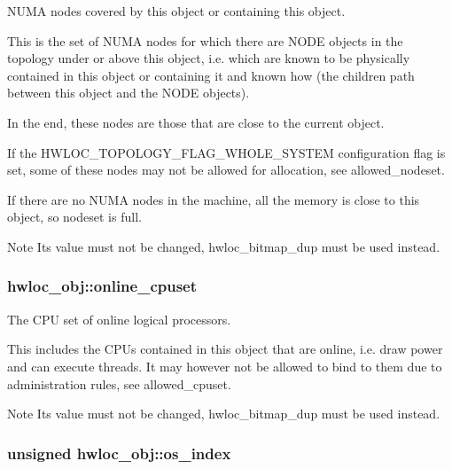 NUMA nodes covered by this object or containing this object. 

This is the set of NUMA nodes for which there are NODE objects in the topology under or above this object, i.e. which are known to be physically contained in this object or containing it and known how (the children path between this object and the NODE objects).

In the end, these nodes are those that are close to the current object.

If the HWLOC\_\-TOPOLOGY\_\-FLAG\_\-WHOLE\_\-SYSTEM configuration flag is set, some of these nodes may not be allowed for allocation, see allowed\_\-nodeset.

If there are no NUMA nodes in the machine, all the memory is close to this object, so {\ttfamily nodeset} is full.

\begin{DoxyNote}{Note}
Its value must not be changed, hwloc\_\-bitmap\_\-dup must be used instead. 
\end{DoxyNote}
\hypertarget{a00016_a8842d56c2975380f327ea401c5f53564}{
\subsubsection[{online\_\-cpuset}]{ {\bf hwloc\_\-obj::online\_\-cpuset}}}
\label{a00016_a8842d56c2975380f327ea401c5f53564}


The CPU set of online logical processors. 

This includes the CPUs contained in this object that are online, i.e. draw power and can execute threads. It may however not be allowed to bind to them due to administration rules, see allowed\_\-cpuset.

\begin{DoxyNote}{Note}
Its value must not be changed, hwloc\_\-bitmap\_\-dup must be used instead. 
\end{DoxyNote}
\hypertarget{a00016_a61a7a80a68eaccbaaa28269e678c81a9}{
\subsubsection[{os\_\-index}]{\setlength{\rightskip}{0pt plus 5cm}unsigned {\bf hwloc\_\-obj::os\_\-index}}}
\label{a00016_a61a7a80a68eaccbaaa28269e678c81a9}


